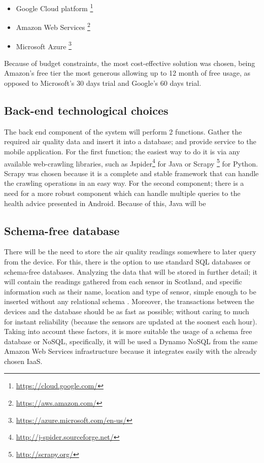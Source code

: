 \begin{itemize}
	\item Google Cloud platform \footnote{\url{https://cloud.google.com/}}
    \item Amazon Web Services \footnote{\url{https://aws.amazon.com/}}
    \item Microsoft Azure \footnote{\url{https://azure.microsoft.com/en-us/}}
\end{itemize}

Because of budget constraints, the most cost-effective solution was chosen, being Amazon's free tier the most generous allowing up to 12 month of free usage, as opposed to Microsoft's 30 days trial and Google's 60 days trial.

\subsection{Back-end technological choices}
The back end component of the system will perform 2 functions. Gather the required air quality data and insert it into a database; and provide service to the mobile application. For the  first function; the easiest way to do it is via any available web-crawling libraries, such as Jspider\footnote{\url{http://j-spider.sourceforge.net/}} for Java or Scrapy \footnote{\url{http://scrapy.org/}} for Python. Scrapy was chosen because it is a complete and stable framework that can handle the crawling operations in an easy way. 
For the second component; there is a need for a more robust component which can handle multiple queries to the health advice presented in Android. Because of this, Java will be 

\subsection{Schema-free database}
There will be the need to store the air quality readings somewhere to later query from the device. For this, there is the option to use standard SQL databases or schema-free databases. Analyzing the data that will be stored in further detail; it will contain the readings gathered from each sensor in Scotland, and specific information such as their name, location and type of sensor, simple enough to be inserted without any relational schema . Moreover, the transactions between the devices and the database should be as fast as possible; without caring to much for instant reliability (because the sensors are updated at the soonest each hour). Taking into account these factors, it is more suitable the usage of a schema free database or NoSQL, specifically, it will be used a Dynamo NoSQL from the same Amazon Web Services infrastructure because it integrates easily with the already chosen IaaS. 

